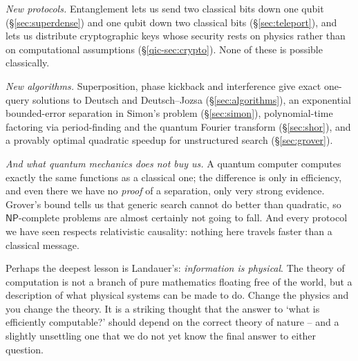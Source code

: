 \documentclass[a4paper]{scrartcl}
\newcommand{\class}[1]{\mathsf{#1}}
\begin{document}
\emph{New protocols.} Entanglement lets us send two classical bits down one qubit (\S\ref{sec:superdense}) and one qubit down two classical bits (\S\ref{sec:teleport}), and lets us distribute cryptographic keys whose security rests on physics rather than on computational assumptions (\S\ref{qic-sec:crypto}). None of these is possible classically.

\emph{New algorithms.} Superposition, phase kickback and interference give exact one-query solutions to Deutsch and Deutsch--Jozsa (\S\ref{sec:algorithms}), an exponential bounded-error separation in Simon's problem (\S\ref{sec:simon}), polynomial-time factoring via period-finding and the quantum Fourier transform (\S\ref{sec:shor}), and a provably optimal quadratic speedup for unstructured search (\S\ref{sec:grover}).

\emph{And what quantum mechanics does not buy us.} A quantum computer computes exactly the same functions as a classical one; the difference is only in efficiency, and even there we have no \emph{proof} of a separation, only very strong evidence. Grover's bound tells us that generic search cannot do better than quadratic, so $\class{NP}$-complete problems are almost certainly not going to fall. And every protocol we have seen respects relativistic causality: nothing here travels faster than a classical message.

Perhaps the deepest lesson is Landauer's: \emph{information is physical}. The theory of computation is not a branch of pure mathematics floating free of the world, but a description of what physical systems can be made to do. Change the physics and you change the theory. It is a striking thought that the answer to `what is efficiently computable?' should depend on the correct theory of nature -- and a slightly unsettling one that we do not yet know the final answer to either question.
\end{document}
